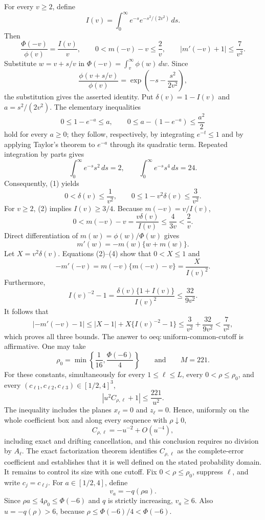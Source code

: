For every \(v\ge 2\), define
\[
I(v)=\int_0^\infty e^{-s}e^{-s^2/(2v^2)}\,ds.
\]
Then
\[
\frac{\Phi(-v)}{\phi(v)}=\frac{I(v)}{v},\qquad
0<m(-v)-v\le \frac{2}{v},
\qquad
\left|m'(-v)+1\right|\le \frac{7}{v^2}.
\]
Substitute \(w=v+s/v\) in \(\Phi(-v)=\int_v^\infty\phi(w)\,dw\).  Since
\[
\frac{\phi(v+s/v)}{\phi(v)}
=\exp\!\left(-s-\frac{s^2}{2v^2}\right),
\]
the substitution gives the asserted identity.  Put \(\delta(v)=1-I(v)\) and \(a=s^2/(2v^2)\).  The elementary inequalities
\[
0\le 1-e^{-a}\le a,
\qquad
0\le a-(1-e^{-a})\le \frac{a^2}{2}
\tag{1}
\]
hold for every \(a\ge0\); they follow, respectively, by integrating \(e^{-t}\le1\) and by applying Taylor's theorem to \(e^{-a}\) through its quadratic term.  Repeated integration by parts gives
\[
\int_0^\infty e^{-s}s^2\,ds=2,
\qquad
\int_0^\infty e^{-s}s^4\,ds=24.
\]
Consequently, (1) yields
\[
0<\delta(v)\le \frac1{v^2},
\qquad
0\le 1-v^2\delta(v)\le \frac3{v^2}.
\tag{2}
\]
For \(v\ge2\), (2) implies \(I(v)\ge3/4\).  Because \(m(-v)=v/I(v)\),
\[
0<m(-v)-v=\frac{v\delta(v)}{I(v)}
\le \frac{4}{3v}<\frac2v.
\tag{3}
\]
Direct differentiation of \(m(w)=\phi(w)/\Phi(w)\) gives
\[
m'(w)=-m(w)\{w+m(w)\}.
\tag{4}
\]
Let \(X=v^2\delta(v)\).  Equations (2)--(4) show that \(0<X\le1\) and
\[
-m'(-v)=m(-v)\{m(-v)-v\}=\frac{X}{I(v)^2}.
\]
Furthermore,
\[
I(v)^{-2}-1
=\frac{\delta(v)\{1+I(v)\}}{I(v)^2}
\le \frac{32}{9v^2}.
\]
It follows that
\[
\left|-m'(-v)-1\right|
\le |X-1|+X\{I(v)^{-2}-1\}
\le \frac3{v^2}+\frac{32}{9v^2}
<\frac7{v^2},
\]
which proves all three bounds.
The answer to \(\mathrm{oeq{:}uniform\text{-}common\text{-}cutoff}\) is affirmative.  One may take
\[
\rho_0=\min\!\left\{\frac1{16},\frac{\Phi(-6)}4\right\}
\qquad\text{and}\qquad M=221.
\]
For these constants, simultaneously for every \(1\le\ell\le L\), every \(0<\rho\le\rho_0\), and every \((c_{\ell1},c_{\ell2},c_{\ell3})\in[1/2,4]^3\),
\[
\left|u^2C_{\rho,\ell}+1\right|\le\frac{221}{u^2}.
\]
The inequality includes the planes \(x_\ell=0\) and \(z_\ell=0\).  Hence, uniformly on the whole coefficient box and along every sequence with \(\rho\downarrow0\),
\[
C_{\rho,\ell}=-u^{-2}+O(u^{-4}),
\]
including exact and drifting cancellation, and this conclusion requires no division by \(A_\ell\).
The exact factorization theorem identifies \(C_{\rho,\ell}\) as the complete-error coefficient and establishes that it is well defined on the stated probability domain.  It remains to control its size with one cutoff.  Fix \(0<\rho\le\rho_0\), suppress \(\ell\), and write \(c_j=c_{\ell j}\).  For \(a\in[1/2,4]\), define
\[
v_a=-q(\rho a).
\]
Since \(\rho a\le4\rho_0\le\Phi(-6)\) and \(q\) is strictly increasing, \(v_a\ge6\).  Also \(u=-q(\rho)>6\), because \(\rho\le\Phi(-6)/4<\Phi(-6)\).

